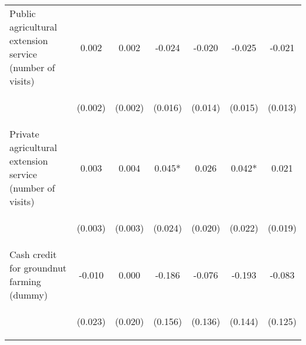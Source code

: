 \begin{center}
\begin{tabular}{lcccccc}
Public agricultural extension service (number of visits) & 0.002 & 0.002 & -0.024 & -0.020 & -0.025 & -0.021 \\
\vspace{4pt} & \begin{footnotesize}(0.002)\end{footnotesize} & \begin{footnotesize}(0.002)\end{footnotesize} & \begin{footnotesize}(0.016)\end{footnotesize} & \begin{footnotesize}(0.014)\end{footnotesize} & \begin{footnotesize}(0.015)\end{footnotesize} & \begin{footnotesize}(0.013)\end{footnotesize} \\
Private agricultural extension service (number of visits) & 0.003 & 0.004 & 0.045* & 0.026 & 0.042* & 0.021 \\
\vspace{4pt} & \begin{footnotesize}(0.003)\end{footnotesize} & \begin{footnotesize}(0.003)\end{footnotesize} & \begin{footnotesize}(0.024)\end{footnotesize} & \begin{footnotesize}(0.020)\end{footnotesize} & \begin{footnotesize}(0.022)\end{footnotesize} & \begin{footnotesize}(0.019)\end{footnotesize} \\
Cash credit for groundnut farming (dummy) & -0.010 & 0.000 & -0.186 & -0.076 & -0.193 & -0.083 \\
\vspace{4pt} & \begin{footnotesize}(0.023)\end{footnotesize} & \begin{footnotesize}(0.020)\end{footnotesize} & \begin{footnotesize}(0.156)\end{footnotesize} & \begin{footnotesize}(0.136)\end{footnotesize} & \begin{footnotesize}(0.144)\end{footnotesize} & \begin{footnotesize}(0.125)\end{footnotesize} \\

\end{tabular}
\end{center}
